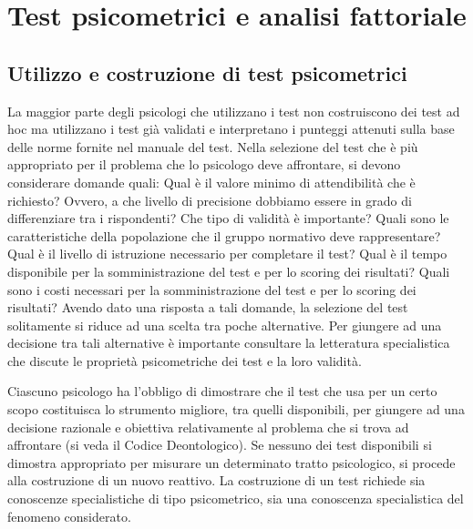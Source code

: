 \chapter{Test psicometrici e analisi fattoriale}
\label{ch:sviluppo}



\section{Utilizzo e costruzione di test psicometrici}

La maggior parte degli psicologi che utilizzano i test non costruiscono dei test ad hoc ma utilizzano i test già validati e interpretano i punteggi attenuti sulla base delle norme fornite nel manuale del test.  Nella selezione del test che è più appropriato per il problema che lo psicologo deve affrontare, si devono considerare domande quali: Qual è il valore minimo di attendibilità che è richiesto? Ovvero, a che livello di precisione dobbiamo essere in grado di differenziare tra i rispondenti? Che tipo di validità è importante?  Quali sono le caratteristiche della popolazione che il gruppo normativo deve rappresentare? Qual è il livello di istruzione necessario per completare il test? Qual è il tempo disponibile per la somministrazione del test e per lo scoring dei risultati? Quali sono i costi necessari per la somministrazione del test e per lo scoring dei risultati? Avendo dato una risposta a tali domande, la selezione del test solitamente si riduce ad una scelta tra poche alternative. Per giungere ad una decisione tra tali alternative è importante consultare la letteratura specialistica che discute le proprietà psicometriche dei test e la loro validità. 

Ciascuno psicologo ha l'obbligo di dimostrare che il test che usa per un certo scopo costituisca lo strumento migliore, tra quelli disponibili, per giungere ad una decisione razionale e obiettiva relativamente al problema che si trova ad affrontare (si veda il Codice Deontologico). Se nessuno dei test disponibili si dimostra appropriato per misurare un determinato tratto psicologico, si procede alla costruzione di un nuovo reattivo. La costruzione di un test richiede sia conoscenze specialistiche di tipo psicometrico, sia una conoscenza specialistica del fenomeno considerato.

